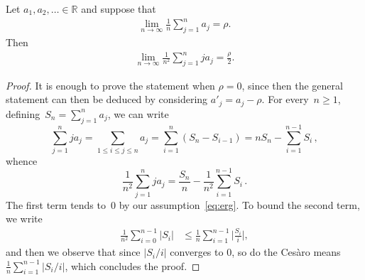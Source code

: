 \documentclass[ECP]{ejpecp} %
\begin{document}
\begin{lemma}%
\label{lem:averages}
Let $a_{1},a_{2},\ldots \in \mathbb{R}$ and suppose that
%
\begin{align}
\label{eq:erg}
\lim _{n\to \infty}\frac{1}{n}\sum _{j=1}^{n}a_{j}=\rho .
\end{align}
%
Then
%
\begin{align}
\label{eq:weighted}
\lim _{n\to \infty}\frac{1}{n^{2}}\sum _{j=1}^{n}ja_{j}=
\frac{\rho }{2}.
\end{align}
%
\end{lemma}
%
\begin{proof}
It is enough to prove the statement when $\rho =0$, since then the general
statement can then be deduced by considering $a'_{j}=a_{j}-\rho $. For
every~$n\geq 1$, defining~$S_{n}=\sum _{j=1}^{n} a_{j}$, we can write
%
\begin{equation*}
\sum _{j=1}^{n} j a_{j} = \sum _{1\leq i\leq j\leq n} a_{j} = \sum _{i=1}^{n}
(S_{n}-S_{i-1}) = nS_{n}-\sum _{i=1}^{n-1}S_{i} \,,
\end{equation*}
%
whence
%
\begin{equation*}
\frac {1}{n^{2}} \sum _{j=1}^{n} j a_{j} = \frac{S_{n}}{n} -
\frac {1}{n^{2}} \sum _{i=1}^{n-1}S_{i} \,.
\end{equation*}
%
The first term tends to~$0$ by our assumption~\eqref{eq:erg}. To bound
the second term, we write
%
\begin{align*}
\frac{1}{n^{2}}\sum _{i=0}^{n-1} \mathopen{\lvert }S_{i}\mathclose{\rvert } &\leq \frac{1}{n}\sum _{i=1}^{n-1}
\mathopen{\bigg \lvert }\frac{S_{i}}{i}\mathclose{\bigg \rvert },
\end{align*}
%
and then we observe that since $\mathopen{\lvert }S_{i}/i \mathclose{\rvert }$ converges to $0$, so do
the Ces\`aro means $\frac{1}{n}\sum _{i=1}^{n-1}\mathopen{\lvert }S_{i}/i \mathclose{\rvert }$, which concludes
the proof.
\end{proof}
\end{document}
